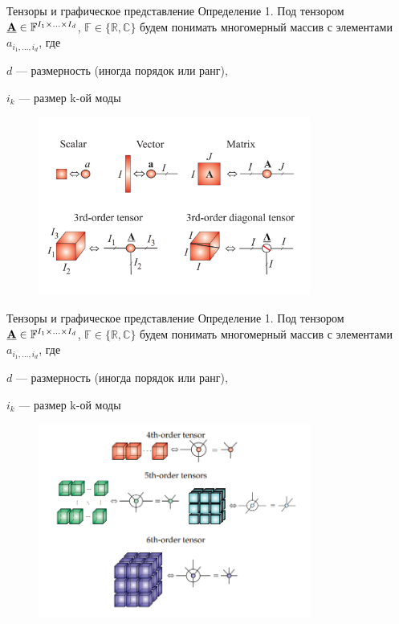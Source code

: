 \begin{frame}{Тензоры и графическое представление}
Определение 1. Под тензором $\underline{\textbf{A}} \in \mathbb{F}^{I_1 \times ... \times I_d} $, $\mathbb{F} \in \{\mathbb{R}, \mathbb{C}\}$ будем понимать многомерный массив  с элементами $a_{i_1,...,i_d}$, где

$d$ --- размерность (иногда порядок или ранг),

$i_k$ --- размер k-ой моды

\begin{figure}
    \centering
    \includegraphics[width=0.8\textwidth]{lecture_10/figs/graph_repr_1.png}
\end{figure}
\end{frame}
\begin{frame}{Тензоры и графическое представление}
Определение 1. Под тензором $\underline{\textbf{A}} \in \mathbb{F}^{I_1 \times ... \times I_d} $, $\mathbb{F} \in \{\mathbb{R}, \mathbb{C}\}$ будем понимать многомерный массив  с элементами $a_{i_1,...,i_d}$, где

$d$ --- размерность (иногда порядок или ранг),

$i_k$ --- размер k-ой моды

\begin{figure}
    \centering
    \includegraphics[width=0.8\textwidth]{lecture_10/figs/graph_repr_1_2.png}
\end{figure}
\end{frame}
